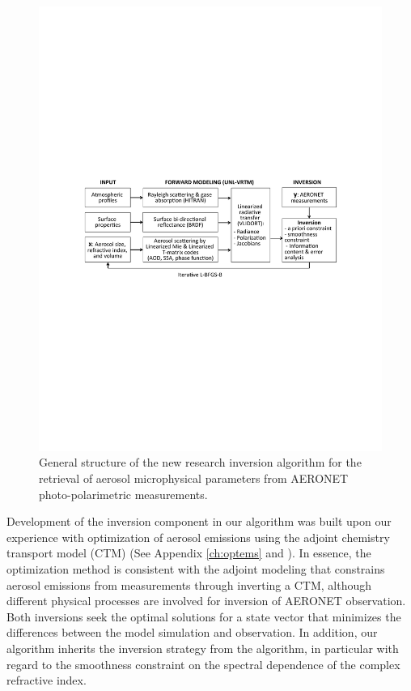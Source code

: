 \begin{figure}[t]
  \centering
  \includegraphics[width={\textwidth}]{figures/algorithm.pdf}
  \caption{General structure of the new research inversion algorithm for
the retrieval of aerosol microphysical parameters from AERONET
photo-polarimetric measurements.}
  \label{fig:alg}
\end{figure}

Development of the inversion component in our algorithm was built upon
our experience with optimization of aerosol emissions using the adjoint
chemistry transport model (CTM) (See Appendix \ref{ch:optems} 
and \citep{Wang12, Xu13}). In essence, the optimization method is 
consistent with the adjoint modeling \citep[e.g.,][]{Henze07}
that constrains aerosol emissions from measurements through inverting a
CTM, although different physical processes are involved for inversion of
AERONET observation. Both inversions seek the optimal solutions for a
state vector that minimizes the differences between the model simulation
and observation. In addition, our algorithm inherits the inversion
strategy from the \Dub algorithm, in particular with regard to
the smoothness constraint on the spectral dependence of the complex
refractive index.

